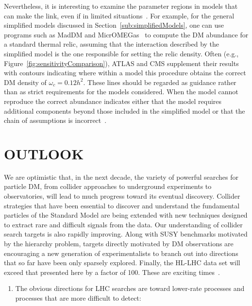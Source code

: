 \documentclass{ar-1col}
\begin{document}
{Nevertheless, it is interesting to
examine the parameter regions in models that can make the link, even if in limited
situations~\cite{Busoni:2014gta,Catena:2017xqq}. For example, for
the general simplified models discussed in
Section~\ref{sub:simplifiedModels}, one can use programs
such as MadDM and
MicrOMEGas~\cite{Backovic:2015cra,Barducci:2016pcb} to compute  the DM
abundance for a standard thermal relic, assuming that the
interaction described by the simplified model is the one
responsible for setting the relic density. Often (e.g.,
Figure~\ref{fig:sensitivityComparison}), ATLAS and CMS supplement
their results with contours indicating where within a model this
procedure obtains the correct DM density of $\omega_c =
0.12 h^2$. These lines should be regarded as guidance rather than as strict
requirements for the models considered. 
When the model cannot reproduce the correct abundance indicates either that  the model requires additional
components beyond those included in the simplified model or that
the chain of assumptions is incorrect~\cite{Bernal:2017kxu}.

\section{OUTLOOK}\label{sec:05_Future}

We are optimistic that, in the next decade, the variety of powerful searches for
particle DM, from collider approaches to underground
experiments to observatories, will lead to much progress toward its eventual discovery.
Collider strategies that have been essential to discover and understand the fundamental particles
of the Standard Model are being extended with new techniques designed to extract rare and difficult
signals from the data. Our understanding of
collider search targets is also rapidly improving. Along with SUSY
benchmarks motivated by the hierarchy problem, targets directly
motivated by DM observations are encouraging a new generation of
experimentalists to branch out into directions that so far have been only
sparsely explored. Finally, the HL-LHC data set will exceed that presented here by a factor of 100. These
are exciting times~\cite{Steigman:1979kw}.

\begin{issues}
\begin{enumerate}

\item The obvious directions for LHC searches are toward lower-rate
processes and processes that are more difficult to detect:


\end{enumerate}
\end{issues}}
\end{document}
